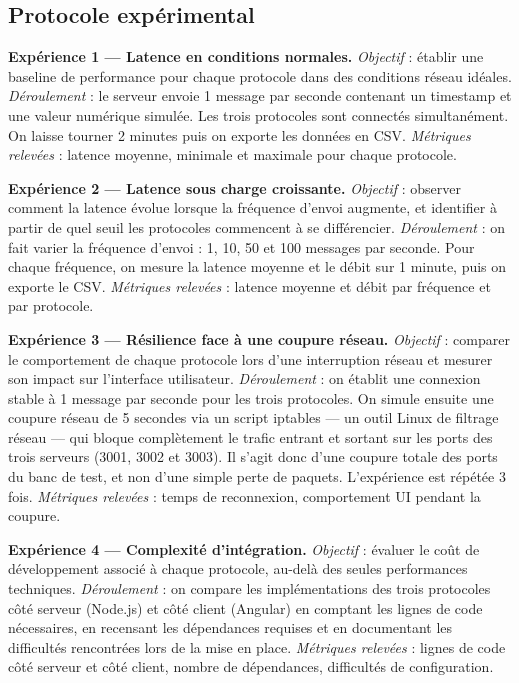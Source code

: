 \subsection{Protocole expérimental}

\textbf{Expérience 1 --- Latence en conditions normales.} \textit{Objectif} : établir une baseline de performance pour chaque protocole dans des conditions réseau idéales. \textit{Déroulement} : le serveur envoie 1 message par seconde contenant un timestamp et une valeur numérique simulée. Les trois protocoles sont connectés simultanément. On laisse tourner 2 minutes puis on exporte les données en CSV. \textit{Métriques relevées} : latence moyenne, minimale et maximale pour chaque protocole.

\textbf{Expérience 2 --- Latence sous charge croissante.} \textit{Objectif} : observer comment la latence évolue lorsque la fréquence d'envoi augmente, et identifier à partir de quel seuil les protocoles commencent à se différencier. \textit{Déroulement} : on fait varier la fréquence d'envoi : 1, 10, 50 et 100 messages par seconde. Pour chaque fréquence, on mesure la latence moyenne et le débit sur 1 minute, puis on exporte le CSV. \textit{Métriques relevées} : latence moyenne et débit par fréquence et par protocole.

\textbf{Expérience 3 --- Résilience face à une coupure réseau.} \textit{Objectif} : comparer le comportement de chaque protocole lors d'une interruption réseau et mesurer son impact sur l'interface utilisateur. \textit{Déroulement} : on établit une connexion stable à 1 message par seconde pour les trois protocoles. On simule ensuite une coupure réseau de 5 secondes via un script iptables --- un outil Linux de filtrage réseau --- qui bloque complètement le trafic entrant et sortant sur les ports des trois serveurs (3001, 3002 et 3003). Il s'agit donc d'une coupure totale des ports du banc de test, et non d'une simple perte de paquets. L'expérience est répétée 3 fois. \textit{Métriques relevées} : temps de reconnexion, comportement UI pendant la coupure.

\textbf{Expérience 4 --- Complexité d'intégration.} \textit{Objectif} : évaluer le coût de développement associé à chaque protocole, au-delà des seules performances techniques. \textit{Déroulement} : on compare les implémentations des trois protocoles côté serveur (Node.js) et côté client (Angular) en comptant les lignes de code nécessaires, en recensant les dépendances requises et en documentant les difficultés rencontrées lors de la mise en place. \textit{Métriques relevées} : lignes de code côté serveur et côté client, nombre de dépendances, difficultés de configuration.

